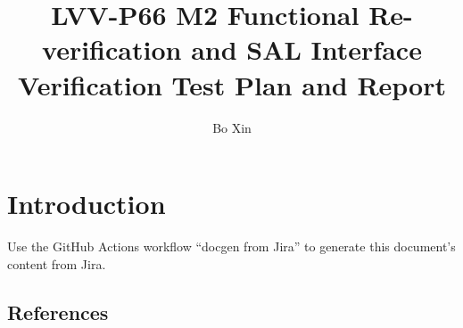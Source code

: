 \documentclass[DM,lsstdraft,toc]{lsstdoc}
\begin{document}
\def\milestoneName{M2 Functional Re-verification and SAL Interface Verification}
\def\milestoneId{LVV-P66}
\def\product{Data Management}


\title{LVV-P66 M2 Functional Re-verification and SAL Interface Verification Test Plan and Report}
\setDocRef{\lsstDocType-\lsstDocNum}
\date{\vcsDate}
\author{Bo Xin}




\maketitle

\section{Introduction}
Use the GitHub Actions workflow ``docgen from Jira'' to generate this document's content from Jira.

\subsection{References}
\label{sect:references}
\renewcommand{\refname}{}




\end{document}
